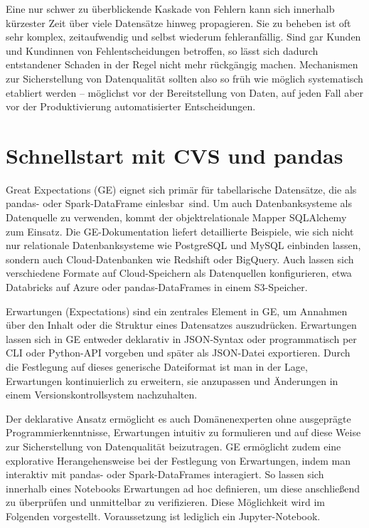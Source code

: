 Eine nur schwer zu überblickende Kaskade von Fehlern kann sich innerhalb kürzester Zeit über viele Datensätze hinweg propagieren. Sie zu beheben ist oft sehr komplex, zeitaufwendig und selbst wiederum fehleranfällig. Sind gar Kunden und Kundinnen von Fehlentscheidungen betroffen, so lässt sich dadurch entstandener Schaden in der Regel nicht mehr rückgängig machen. Mechanismen zur Sicherstellung von Datenqualität sollten also so früh wie möglich systematisch etabliert werden – möglichst vor der Bereitstellung von Daten, auf jeden Fall aber vor der Produktivierung automatisierter Entscheidungen.

\section{ Schnellstart mit CVS und pandas}
	
Great Expectations (GE) eignet sich primär für tabellarische Datensätze, die als pandas- oder Spark-DataFrame einlesbar sind. Um auch Datenbanksysteme als Datenquelle zu verwenden, kommt der objektrelationale Mapper SQLAlchemy zum Einsatz. Die GE-Dokumentation liefert detaillierte Beispiele, wie sich nicht nur relationale Datenbanksysteme wie PostgreSQL und MySQL einbinden lassen, sondern auch Cloud-Datenbanken wie Redshift oder BigQuery. Auch lassen sich verschiedene Formate auf Cloud-Speichern als Datenquellen konfigurieren, etwa Databricks auf Azure oder pandas-DataFrames in einem S3-Speicher.
	
Erwartungen (Expectations) sind ein zentrales Element in GE, um Annahmen über den Inhalt oder die Struktur eines Datensatzes auszudrücken. Erwartungen lassen sich in GE entweder deklarativ in JSON-Syntax oder programmatisch per CLI oder Python-API vorgeben und später als JSON-Datei exportieren. Durch die Festlegung auf dieses generische Dateiformat ist man in der Lage, Erwartungen kontinuierlich zu erweitern, sie anzupassen und Änderungen in einem Versionskontrollsystem nachzuhalten.
	
Der deklarative Ansatz ermöglicht es auch Domänenexperten ohne ausgeprägte Programmierkenntnisse, Erwartungen intuitiv zu formulieren und auf diese Weise zur Sicherstellung von Datenqualität beizutragen. GE ermöglicht zudem eine explorative Herangehensweise bei der Festlegung von Erwartungen, indem man interaktiv mit pandas- oder Spark-DataFrames interagiert. So lassen sich innerhalb eines Notebooks Erwartungen ad hoc definieren, um diese anschließend zu überprüfen und unmittelbar zu verifizieren. Diese Möglichkeit wird im Folgenden vorgestellt. Voraussetzung ist lediglich ein Jupyter-Notebook. 
	 
